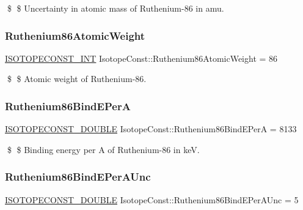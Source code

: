 \$ \$ Uncertainty in atomic mass of Ruthenium-\/86 in amu. \mbox{\label{group___isotope_const-_ruthenium-_ru86_ga99530d80409b9d5c0e87ca04028c5f70}} 
\subsubsection{\texorpdfstring{Ruthenium86\+Atomic\+Weight}{Ruthenium86AtomicWeight}}
{\footnotesize\ttfamily \mbox{\hyperlink{group___isotope_const-_macros_ga5f18360b3e99483a35c32d789e62621c}{I\+S\+O\+T\+O\+P\+E\+C\+O\+N\+S\+T\+\_\+\+I\+NT}} Isotope\+Const\+::\+Ruthenium86\+Atomic\+Weight = 86}

\$ \$ Atomic weight of Ruthenium-\/86. \mbox{\label{group___isotope_const-_ruthenium-_ru86_ga6ea3da18f6b676b28cee9928cfcbc213}} 
\subsubsection{\texorpdfstring{Ruthenium86\+Bind\+E\+PerA}{Ruthenium86BindEPerA}}
{\footnotesize\ttfamily \mbox{\hyperlink{group___isotope_const-_macros_ga8f45a7272ce02c0b4c65c44636ed719a}{I\+S\+O\+T\+O\+P\+E\+C\+O\+N\+S\+T\+\_\+\+D\+O\+U\+B\+LE}} Isotope\+Const\+::\+Ruthenium86\+Bind\+E\+PerA = 8133}

\$ \$ Binding energy per A of Ruthenium-\/86 in keV. \mbox{\label{group___isotope_const-_ruthenium-_ru86_ga059bcff6141c19852ca82abf458f1d8e}} 
\subsubsection{\texorpdfstring{Ruthenium86\+Bind\+E\+Per\+A\+Unc}{Ruthenium86BindEPerAUnc}}
{\footnotesize\ttfamily \mbox{\hyperlink{group___isotope_const-_macros_ga8f45a7272ce02c0b4c65c44636ed719a}{I\+S\+O\+T\+O\+P\+E\+C\+O\+N\+S\+T\+\_\+\+D\+O\+U\+B\+LE}} Isotope\+Const\+::\+Ruthenium86\+Bind\+E\+Per\+A\+Unc = 5}


